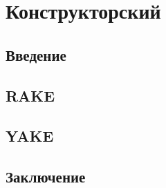 \section{Конструкторский}
\subsection{Введение}
\subsection{RAKE}
\subsection{YAKE}
\subsection{Заключение}